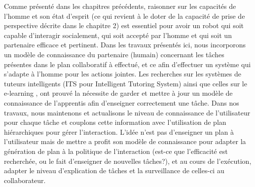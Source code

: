 \documentclass[a4paper,11pt,twoside]{StyleThese}
\begin{document}
Comme présenté dans les chapitres précédents, raisonner sur les capacités de l'homme et son état d'esprit (ce qui revient à le doter de la capacité de prise de perspective décrite dans le chapitre 2) est essentiel pour avoir un robot qui soit capable d'interagir socialement, qui soit accepté par l'homme et qui soit un partenaire efficace et pertinent.
Dans les travaux présentés ici, nous incorporons un modèle de connaissance du partenaire (humain) concernant les tâches présentes dans le plan collaboratif à effectué, et ce afin d'effectuer un système qui s'adapte à l'homme pour les actions jointes.
Les recherches sur les systèmes de tuteurs intelligents (ITS pour Intelligent Tutoring System) \cite{brusilovskiy1994construction} ainsi que celles sur le e-learning \cite{brusilovskiy2005}, ont prouvé la nécessite de garder et mettre à jour un modèle de connaissance de l'apprentis afin d'enseigner correctement une tâche.
%
Dans nos travaux, nous maintenons et actualisons le niveau de connaissance de l'utilisateur pour chaque tâche et couplons cette information avec l'utilisation de plan hiérarchiques pour gérer l'interaction. L'idée n'est pas d'enseigner un plan à l'utilisateur mais de mettre a profit son modèle de connaissance pour adapter la génération de plan à la politique de l'interaction (est-ce que l'efficacité est recherchée, ou le fait d'enseigner de nouvelles tâches?), et au cours de l'exécution, adapter le niveau d'explication de tâches et la surveillance de celles-ci au collaborateur.
%
\end{document}
